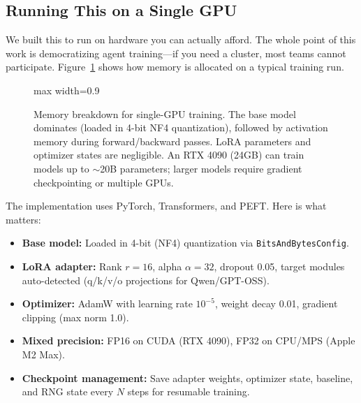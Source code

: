 \documentclass[11pt]{article}
\begin{document}
\subsection{Running This on a Single GPU}

We built this to run on hardware you can actually afford.
The whole point of this work is democratizing agent training---if you need a cluster, most teams cannot participate.
Figure~\ref{fig:memory-breakdown} shows how memory is allocated on a typical training run.

\begin{figure}[t]
\centering
\begin{adjustbox}{max width=0.9\linewidth}
\end{adjustbox}
\caption{Memory breakdown for single-GPU training.
The base model dominates (loaded in 4-bit NF4 quantization), followed by activation memory during forward/backward passes.
LoRA parameters and optimizer states are negligible.
An RTX 4090 (24GB) can train models up to $\sim$20B parameters; larger models require gradient checkpointing or multiple GPUs.}
\label{fig:memory-breakdown}
\end{figure}

The implementation uses PyTorch, Transformers, and PEFT.
Here is what matters:
\begin{itemize}[leftmargin=12pt]
    \item \textbf{Base model:} Loaded in 4-bit (NF4) quantization via \texttt{BitsAndBytesConfig}.
    \item \textbf{LoRA adapter:} Rank $r=16$, alpha $\alpha=32$, dropout 0.05, target modules auto-detected (q/k/v/o projections for Qwen/GPT-OSS).
    \item \textbf{Optimizer:} AdamW with learning rate $10^{-5}$, weight decay 0.01, gradient clipping (max norm 1.0).
    \item \textbf{Mixed precision:} FP16 on CUDA (RTX 4090), FP32 on CPU/MPS (Apple M2 Max).
    \item \textbf{Checkpoint management:} Save adapter weights, optimizer state, baseline, and RNG state every $N$ steps for resumable training.
\end{itemize}
\end{document}
